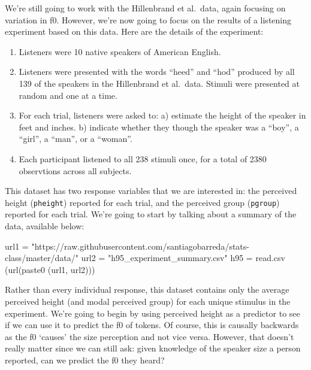 \documentclass[
]{book}
\newenvironment{Shaded}{\begin{snugshade}}{\end{snugshade}}
\newcommand{\FunctionTok}[1]{\textcolor[rgb]{0.00,0.00,0.00}{#1}}
\newcommand{\NormalTok}[1]{#1}
\newcommand{\OtherTok}[1]{\textcolor[rgb]{0.56,0.35,0.01}{#1}}
\newcommand{\StringTok}[1]{\textcolor[rgb]{0.31,0.60,0.02}{#1}}
\begin{document}
We're still going to work with the Hillenbrand et al.~data, again focusing on variation in f0. However, we're now going to focus on the results of a listening experiment based on this data. Here are the details of the experiment:

\begin{enumerate}
\def\labelenumi{\arabic{enumi})}
\item
  Listeners were 10 native speakers of American English.
\item
  Listeners were presented with the words ``heed'' and ``hod'' produced by all 139 of the speakers in the Hillenbrand et al.~data. Stimuli were presented at random and one at a time.
\item
  For each trial, listeners were asked to:
  a) estimate the height of the speaker in feet and inches.
  b) indicate whether they though the speaker was a ``boy'', a ``girl'', a ``man'', or a ``woman''.
\item
  Each participant listened to all 238 stimuli once, for a total of 2380 observtions across all subjects.
\end{enumerate}

This dataset has two response variables that we are interested in: the perceived height (\texttt{pheight}) reported for each trial, and the perceived group (\texttt{pgroup}) reported for each trial. We're going to start by talking about a summary of the data, available below:

\begin{Shaded}
\begin{Highlighting}[]
\NormalTok{url1 }\OtherTok{=} \StringTok{"https://raw.githubusercontent.com/santiagobarreda/stats{-}class/master/data/"}
\NormalTok{url2 }\OtherTok{=} \StringTok{"h95\_experiment\_summary.csv"}
\NormalTok{h95 }\OtherTok{=} \FunctionTok{read.csv}\NormalTok{ (}\FunctionTok{url}\NormalTok{(}\FunctionTok{paste0}\NormalTok{ (url1, url2)))}
\end{Highlighting}
\end{Shaded}

Rather than every individual response, this dataset contains only the average perceived height (and modal perceived group) for each unique stimulus in the experiment. We're going to begin by using perceived height as a predictor to see if we can use it to predict the f0 of tokens. Of course, this is causally backwards as the f0 `causes' the size perception and not vice versa. However, that doesn't really matter since we can still ask: given knowledge of the speaker size a person reported, can we predict the f0 they heard?
\end{document}
